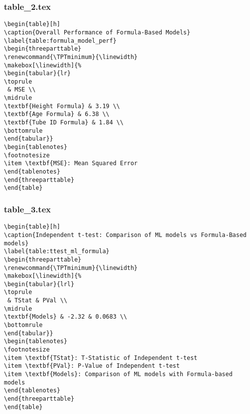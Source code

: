 \documentclass[11pt]{article}
\begin{document}
\subsubsection*{table\_2.tex}

\begin{Verbatim}[tabsize=4]
\begin{table}[h]
\caption{Overall Performance of Formula-Based Models}
\label{table:formula_model_perf}
\begin{threeparttable}
\renewcommand{\TPTminimum}{\linewidth}
\makebox[\linewidth]{%
\begin{tabular}{lr}
\toprule
 & MSE \\
\midrule
\textbf{Height Formula} & 3.19 \\
\textbf{Age Formula} & 6.38 \\
\textbf{Tube ID Formula} & 1.84 \\
\bottomrule
\end{tabular}}
\begin{tablenotes}
\footnotesize
\item \textbf{MSE}: Mean Squared Error
\end{tablenotes}
\end{threeparttable}
\end{table}

\end{Verbatim}

\subsubsection*{table\_3.tex}

\begin{Verbatim}[tabsize=4]
\begin{table}[h]
\caption{Independent t-test: Comparison of ML models vs Formula-Based models}
\label{table:ttest_ml_formula}
\begin{threeparttable}
\renewcommand{\TPTminimum}{\linewidth}
\makebox[\linewidth]{%
\begin{tabular}{lrl}
\toprule
 & TStat & PVal \\
\midrule
\textbf{Models} & -2.32 & 0.0683 \\
\bottomrule
\end{tabular}}
\begin{tablenotes}
\footnotesize
\item \textbf{TStat}: T-Statistic of Independent t-test
\item \textbf{PVal}: P-Value of Independent t-test
\item \textbf{Models}: Comparison of ML models with Formula-based models
\end{tablenotes}
\end{threeparttable}
\end{table}

\end{Verbatim}
\end{document}
